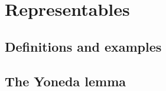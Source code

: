 \chapter{Representables}



\section{Definitions and examples}
\addtocounter{subsection}{25}










\section{The Yoneda lemma}
\addtocounter{subsection}{1}

